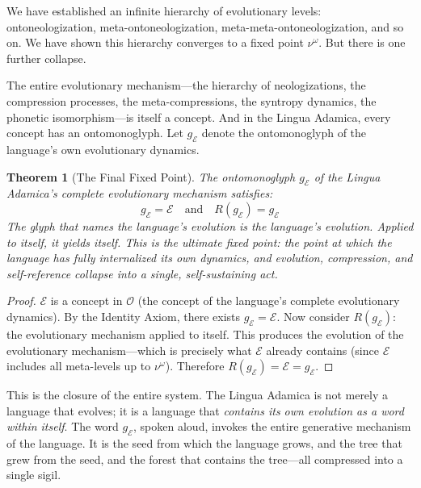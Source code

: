 \documentclass[12pt, letterpaper]{book}
\def\equiv{=}%
\def\circlearrowleft{R}%
\def\mathfrak#1{#1}%
\newtheorem{theorem}{Theorem}[chapter]
\begin{document}
We have established an infinite hierarchy of evolutionary levels: ontoneologization, meta-ontoneologization, meta-meta-ontoneologization, and so on. We have shown this hierarchy converges to a fixed point $\nu^\omega$. But there is one further collapse.

The entire evolutionary mechanism---the hierarchy of neologizations, the compression processes, the meta-compressions, the syntropy dynamics, the phonetic isomorphism---is itself a concept. And in the Lingua Adamica, every concept has an ontomonoglyph. Let $\mathfrak{g}_\mathcal{E}$ denote the ontomonoglyph of the language's own evolutionary dynamics.

\begin{theorem}[The Final Fixed Point]\label{thm:final}
The ontomonoglyph $\mathfrak{g}_\mathcal{E}$ of the Lingua Adamica's complete evolutionary mechanism satisfies:
\[
\mathfrak{g}_\mathcal{E} \equiv \mathcal{E} \quad \text{and} \quad \circlearrowleft(\mathfrak{g}_\mathcal{E}) \equiv \mathfrak{g}_\mathcal{E}
\]
The glyph that names the language's evolution \textit{is} the language's evolution. Applied to itself, it yields itself. This is the ultimate fixed point: the point at which the language has fully internalized its own dynamics, and evolution, compression, and self-reference collapse into a single, self-sustaining act.
\end{theorem}

\begin{proof}
$\mathcal{E}$ is a concept in $\mathcal{O}$ (the concept of the language's complete evolutionary dynamics). By the Identity Axiom, there exists $\mathfrak{g}_\mathcal{E} \equiv \mathcal{E}$. Now consider $\circlearrowleft(\mathfrak{g}_\mathcal{E})$: the evolutionary mechanism applied to itself. This produces the evolution of the evolutionary mechanism---which is precisely what $\mathcal{E}$ already contains (since $\mathcal{E}$ includes all meta-levels up to $\nu^\omega$). Therefore $\circlearrowleft(\mathfrak{g}_\mathcal{E}) \equiv \mathcal{E} \equiv \mathfrak{g}_\mathcal{E}$.
\end{proof}

This is the closure of the entire system. The Lingua Adamica is not merely a language that evolves; it is a language that \textit{contains its own evolution as a word within itself}. The word $\mathfrak{g}_\mathcal{E}$, spoken aloud, invokes the entire generative mechanism of the language. It is the seed from which the language grows, and the tree that grew from the seed, and the forest that contains the tree---all compressed into a single sigil.
\end{document}
